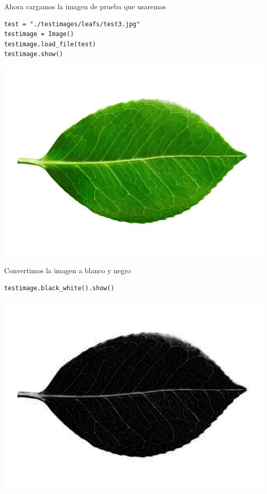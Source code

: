 \documentclass[letter]{article}
\begin{document}
Ahora cargamos la imagen de prueba que usaremos

\begin{verbatim}
test = "./testimages/leafs/test3.jpg"
testimage = Image()
testimage.load_file(test)
testimage.show()
\end{verbatim}

\begin{center}
\includegraphics[width=.9\linewidth]{./images/test.png}
\end{center}

Convertimos la imagen a blanco y negro

\begin{verbatim}
testimage.black_white().show()

\end{verbatim}

\begin{center}
\includegraphics[width=.9\linewidth]{./images/testbn.png}
\end{center}
\end{document}
